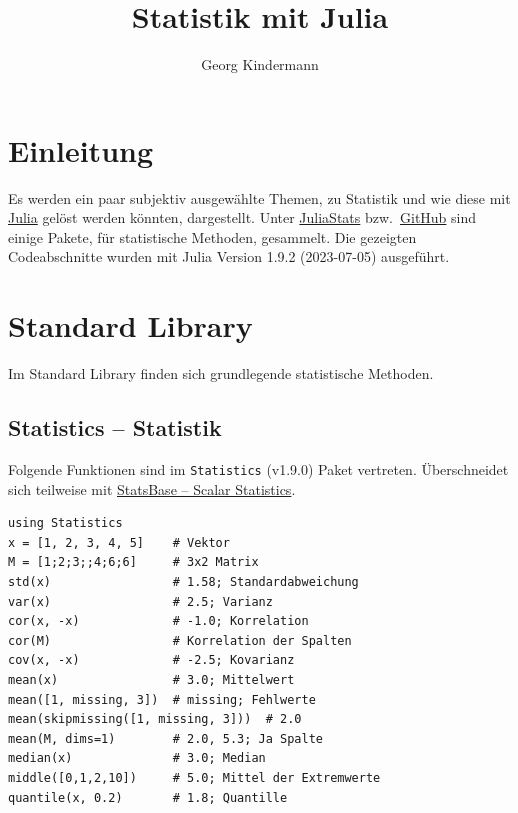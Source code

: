 \documentclass[10pt,twocolumn]{scrartcl}
\title{Statistik mit Julia}
\author{Georg Kindermann}
\begin{document}
\maketitle


\tableofcontents

\section{Einleitung}
\label{sec:einleitung}

Es werden ein paar subjektiv ausgewählte Themen, zu Statistik und wie diese mit
\href{https://julialang.org/}{Julia} gelöst werden könnten, dargestellt. Unter
\href{https://juliastats.org/}{JuliaStats} bzw.\
\href{https://github.com/JuliaStats/}{GitHub} sind einige Pakete, für
statistische Methoden, gesammelt. Die gezeigten Codeabschnitte wurden mit Julia
Version 1.9.2 (2023-07-05) ausgeführt.

\section{Standard Library}
\label{sec:standardLibrary}

Im Standard Library finden sich grundlegende statistische Methoden.

\subsection{Statistics -- Statistik}
\label{ssec:standardLibrary_Statistics}

Folgende Funktionen sind im \lstinline|Statistics| (v1.9.0) Paket vertreten.
Überschneidet sich teilweise mit
\hyperref[ssec:StatsBase_ScalarStatistics]{StatsBase -- Scalar Statistics}.

\begin{lstlisting}
using Statistics
x = [1, 2, 3, 4, 5]    # Vektor
M = [1;2;3;;4;6;6]     # 3x2 Matrix
std(x)                 # 1.58; Standardabweichung
var(x)                 # 2.5; Varianz
cor(x, -x)             # -1.0; Korrelation
cor(M)                 # Korrelation der Spalten
cov(x, -x)             # -2.5; Kovarianz
mean(x)                # 3.0; Mittelwert
mean([1, missing, 3])  # missing; Fehlwerte
mean(skipmissing([1, missing, 3]))  # 2.0
mean(M, dims=1)        # 2.0, 5.3; Ja Spalte
median(x)              # 3.0; Median
middle([0,1,2,10])     # 5.0; Mittel der Extremwerte
quantile(x, 0.2)       # 1.8; Quantille
\end{lstlisting}
\end{document}
